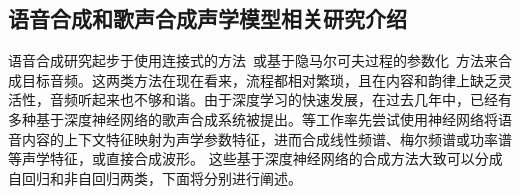 \subsection{语音合成和歌声合成声学模型相关研究介绍}
\label{sec:svs_intro}
语音合成研究起步于使用连接式的方法~\citep{macon1997concatenation,kenmochi2007vocaloid}或基于隐马尔可夫过程的参数化~\citep{saino2006hmm,oura2010recent}方法来合成目标音频。这两类方法在现在看来，流程都相对繁琐，且在内容和韵律上缺乏灵活性，音频听起来也不够和谐。由于深度学习的快速发展，在过去几年中，已经有多种基于深度神经网络的歌声合成系统被提出。\citet{nishimura2016singing,blaauw2017neural,kim2018korean,nakamura2019singing,gu2020bytesing}等工作率先尝试使用神经网络将语音内容的上下文特征映射为声学参数特征，进而合成线性频谱、梅尔频谱或功率谱等声学特征，或直接合成波形。
这些基于深度神经网络的合成方法大致可以分成自回归和非自回归两类，下面将分别进行阐述。
